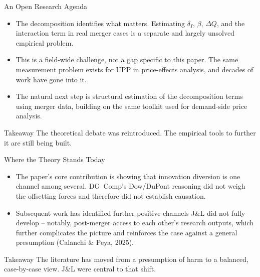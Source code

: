 \documentclass[10pt, aspectratio=169]{beamer}
\begin{document}
\begin{frame}{An Open Research Agenda}
  \begin{itemize}
    \item The decomposition identifies what matters. Estimating
          $\delta_I$, $\beta$, $\Delta Q$, and the interaction
          term in real merger cases is a separate and
          largely unsolved empirical problem.
    \item This is a field-wide challenge, not a gap specific
          to this paper. The same measurement problem
          exists for UPP in price-effects analysis, and
          decades of work have gone into it.
    \item The natural next step is structural estimation of
          the decomposition terms using merger data, building
          on the same toolkit used for demand-side price
          analysis.
  \end{itemize}
  \begin{alertblock}{Takeaway}
    The theoretical debate was reintroduced. The empirical
    tools to further it are still being built.
  \end{alertblock}
\end{frame}


\begin{frame}{Where the Theory Stands Today}
  \begin{itemize}
    \item The paper's core contribution is showing that
          innovation diversion is one channel among several.
          DG~Comp's Dow/DuPont reasoning did not weigh the
          offsetting forces and therefore did not establish
          causation.
    \item Subsequent work has identified further positive
          channels J\&L did not fully develop -- notably,
          post-merger access to each other's research
          outputs, which further complicates the picture
          and reinforces the case against a general
          presumption (Calanchi \& Peya, 2025).
  \end{itemize}
  \begin{block}{Takeaway}
    The literature has moved from a presumption of harm
    to a balanced, case-by-case view. J\&L were central
    to that shift.
  \end{block}
\end{frame}
\end{document}
